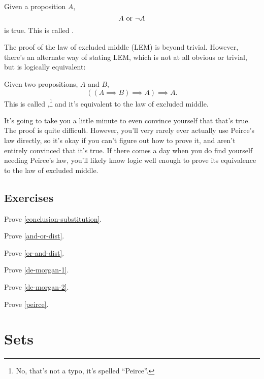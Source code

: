 \begin{lemma}
  \label{lem}
  Given a proposition $A$, $$A \text{ or } \lnot A$$ is true. This is called
  .
\end{lemma}

The proof of the law of excluded middle (LEM) is beyond
trivial. However, there's an alternate way of stating LEM, which is
not at all obvious or trivial, but is logically equivalent:

\begin{lemma}
  \label{peirce}
  Given two propositions, $A$ and $B$,
  $$((A \implies B) \implies A) \implies A.$$ This is called
  ,\footnote{No, that's not a typo, it's spelled
    ``Peirce''.} and it's equivalent to the law of excluded middle.
\end{lemma}

It's going to take you a little minute to even convince yourself that
that's true. The proof is quite difficult. However, you'll very rarely
ever actually use Peirce's law directly, so it's okay if you can't
figure out how to prove it, and aren't entirely convinced that it's
true. If there comes a day when you do find yourself needing Peirce's
law, you'll likely know logic well enough to prove its equivalence to
the law of excluded middle.

\subsection{Exercises}

\begin{exercise}
  Prove \cref{conclusion-substitution}.
\end{exercise}
\begin{exercise}
  Prove \cref{and-or-dist}.
\end{exercise}
\begin{exercise}
  Prove \cref{or-and-dist}.
\end{exercise}
\begin{exercise}
  Prove \cref{de-morgan-1}.
\end{exercise}
\begin{exercise}
  Prove \cref{de-morgan-2}.
\end{exercise}
\begin{exercise}
  Prove \cref{peirce}.
\end{exercise}

\section{Sets}
\label{s:sets}

